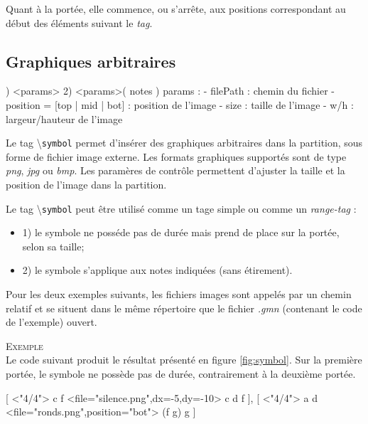 \documentclass{article}
\newenvironment{gmncode}	{\vspace{-2mm}\small\verbatim}{\endverbatim\vspace{-2mm}}
\newcommand{\code}[1]		{{\small \texttt{#1}}}
\newcommand{\guidotag}[1]	{\textbackslash\code{#1}}
\newcommand{\exemple}		{\vspace{2mm}\hspace*{-6mm}\textsc{Exemple}}
\begin{document}
Quant à la portée, elle commence, ou s'arrête, aux positions correspondant au début des éléments suivant le \emph{tag}.


\subsection{Graphiques arbitraires}\label{subsec:graphiquesAbstraites}
\bigskip

\begin{gmncode}
1) \symbol<params>
2) \symbol<params>( notes )
    params : 
    - filePath : chemin du fichier
    - position = [top | mid | bot] :
      position de l'image
    - size : taille de l'image
    - w/h : largeur/hauteur de l'image
\end{gmncode}

Le tag \guidotag{symbol} permet d'insérer des graphiques arbitraires dans la partition, sous forme de fichier image externe. Les formats graphiques supportés sont de type \emph{png}, \emph{jpg} ou \emph{bmp}. Les paramères de contrôle permettent d'ajuster la taille et la position de l'image dans la partition.

Le tag \guidotag{symbol} peut être utilisé comme un tage simple ou comme un \emph{range-tag} :
\begin{itemize}
	\item 1) le symbole ne posséde pas de durée mais prend de place sur la portée, selon sa taille;
	\item 2) le symbole s'applique aux notes indiquées (sans étirement).
\end{itemize}

Pour les deux exemples suivants, les fichiers images sont appelés par un chemin relatif et se situent dans le même répertoire que le fichier \emph{.gmn} (contenant le code de l'exemple) ouvert.

\exemple\\
Le code suivant produit le résultat présenté en figure \ref{fig:symbol}. Sur la première portée, le symbole ne possède pas de durée, contrairement à la deuxième portée.

\begin{gmncode}
{
 [
  \meter<"4/4"> c f
  \symbol<file="silence.png",dx=-5,dy=-10> 
   c d f
 ],
 [
  \meter<"4/4"> a d
  \symbol<file="ronds.png",position="bot"> 
  (f g) g
 ]
}
\end{gmncode}
\end{document}
